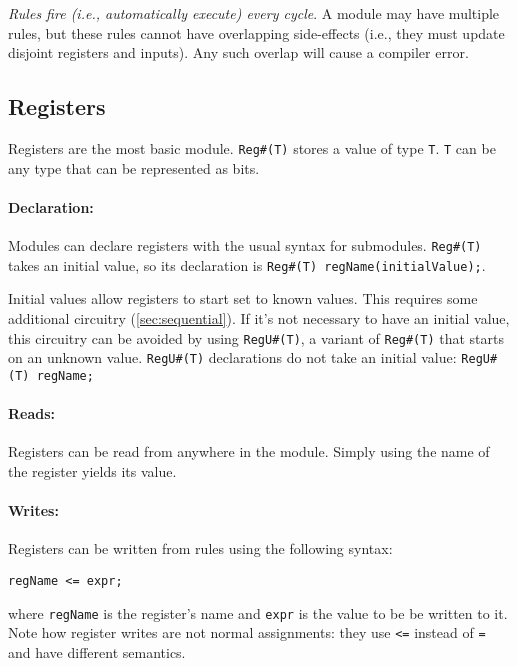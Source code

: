 \emph{Rules fire (i.e., automatically execute) every cycle}. A module may have multiple rules,
but these rules cannot have overlapping side-effects
(i.e., they must update disjoint registers and inputs).
Any such overlap will cause a compiler error.


\subsection{Registers}
\label{sec:registers}

Registers are the most basic module.
\verb|Reg#(T)| stores a value of type \verb|T|.
\verb|T| can be any type that can be represented as bits.

\paragraph{Declaration:}
Modules can declare registers with the usual syntax for submodules.
\verb|Reg#(T)| takes an initial value, so its declaration
is \verb|Reg#(T) regName(initialValue);|.

Initial values allow registers to start set to known values.
This requires some additional circuitry (\autoref{sec:sequential}).
If it's not necessary to have an initial value, this circuitry can be avoided by using
\verb|RegU#(T)|, a variant of \verb|Reg#(T)| that starts on an unknown value.
\verb|RegU#(T)| declarations do not take an initial value: \verb|RegU#(T) regName;|

\paragraph{Reads:}
Registers can be read from anywhere in the module.
Simply using the name of the register yields its value.

\paragraph{Writes:}
Registers can be written from rules using the following syntax:
\begin{center}
\verb|regName <= expr;|
\end{center}
where \verb|regName| is the register's name and \verb|expr| is the value to be be written to it.
Note how register writes are not normal assignments: they use \verb|<=| instead of \verb|=|
and have different semantics.

